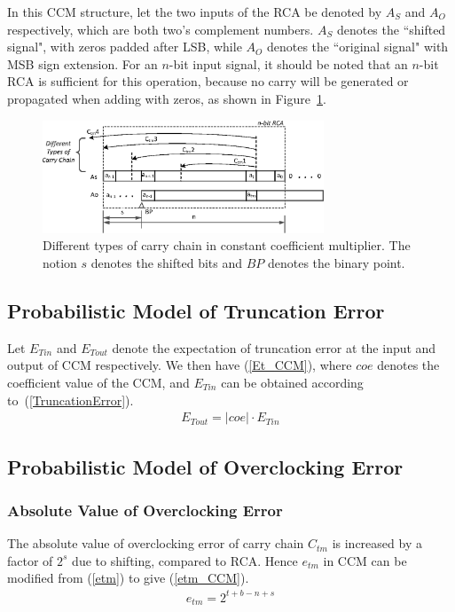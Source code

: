 \documentclass[journal]{IEEEtran}
\begin{document}
In this CCM structure, let the two inputs of the RCA be denoted by $A_S$ and $A_O$ respectively, which are both two's complement numbers. $A_S$ denotes the ``shifted signal", with zeros padded after LSB, while $A_O$ denotes the ``original signal" with MSB sign extension. For an $n$-bit input signal, it should be noted that an $n$-bit RCA is sufficient for this operation, because no carry will be generated or propagated when adding with zeros, as shown in Figure~\ref{CCM_fig}.
\begin{figure}[htbp]
  \centering
  \includegraphics[width=3.3in]{./Figures/CCM_DataFlow3.eps}
  \caption{Different types of carry chain in constant coefficient multiplier. The notion $s$ denotes the shifted bits and $BP$ denotes the binary point.}
  \label{CCM_fig}
\end{figure}

\subsection{Probabilistic Model of Truncation Error}
Let $E_{Tin}$ and $E_{Tout}$ denote the expectation of truncation error at the input and output of CCM respectively. We then have (\ref{Et_CCM}), where $coe$ denotes the coefficient value of the CCM, and $E_{Tin}$ can be obtained according to~(\ref{TruncationError}).
%
\begin{eqnarray}\label{Et_CCM}
  E_{Tout}=|coe|\cdot E_{Tin}
\end{eqnarray}

\subsection{Probabilistic Model of Overclocking Error}
\subsubsection{Absolute Value of Overclocking Error}
The absolute value of overclocking error of carry chain $C_{tm}$ is increased by a factor of $2^s$ due to shifting, compared to RCA. Hence $e_{tm}$ in CCM can be modified from (\ref{etm}) to give (\ref{etm_CCM}).
%
\begin{eqnarray}\label{etm_CCM}
  e_{tm}=2^{t+b-n+s}
\end{eqnarray}
\end{document}
